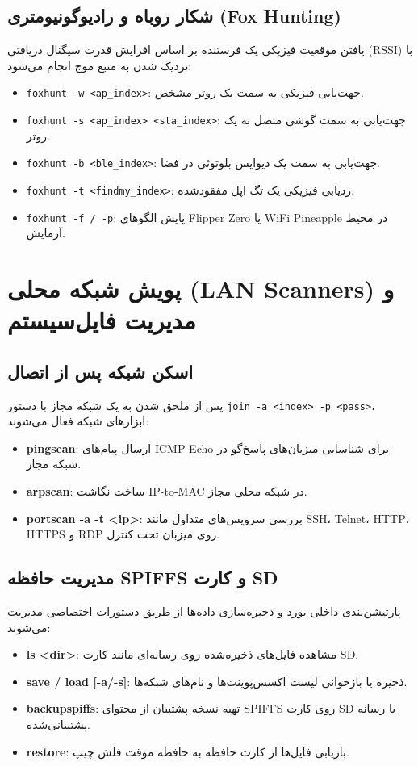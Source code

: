 \documentclass[11pt,a4paper]{article}
\newcommand{\lr}[1]{\foreignlanguage{english}{#1}}
\newcommand{\en}[1]{\lr{#1}}
\begin{document}
\subsection{شکار روباه و رادیوگونیومتری \en{(Fox Hunting)}}
یافتن موقعیت فیزیکی یک فرستنده بر اساس افزایش قدرت سیگنال دریافتی (\lr{RSSI}) با نزدیک شدن به منبع موج انجام می‌شود:
\begin{itemize}
    \item \lr{\texttt{foxhunt -w <ap\_index>}:} جهت‌یابی فیزیکی به سمت یک روتر مشخص.
    \item \lr{\texttt{foxhunt -s <ap\_index> <sta\_index>}:} جهت‌یابی به سمت گوشی متصل به یک روتر.
    \item \lr{\texttt{foxhunt -b <ble\_index>}:} جهت‌یابی به سمت یک دیوایس بلوتوثی در فضا.
    \item \lr{\texttt{foxhunt -t <findmy\_index>}:} ردیابی فیزیکی یک تگ اپل مفقودشده.
    \item \lr{\texttt{foxhunt -f / -p}:} پایش الگوهای \en{Flipper Zero} یا \en{WiFi Pineapple} در محیط آزمایش.
\end{itemize}

\section{پویش شبکه محلی \en{(LAN Scanners)} و مدیریت فایل‌سیستم}

\subsection{اسکن شبکه پس از اتصال}
پس از ملحق شدن به یک شبکه مجاز با دستور \lr{\texttt{join -a <index> -p <pass>}}، ابزارهای شبکه فعال می‌شوند:
\begin{itemize}
    \item \lr{\textbf{pingscan}:} ارسال پیام‌های \en{ICMP Echo} برای شناسایی میزبان‌های پاسخ‌گو در شبکه مجاز.
    \item \lr{\textbf{arpscan}:} ساخت نگاشت \en{IP-to-MAC} در شبکه محلی مجاز.
    \item \lr{\textbf{portscan -a -t <ip>}:} بررسی سرویس‌های متداول مانند \en{SSH}، \en{Telnet}، \en{HTTP}، \en{HTTPS} و \en{RDP} روی میزبان تحت کنترل.
\end{itemize}

\subsection{مدیریت حافظه \en{SPIFFS} و کارت \en{SD}}
پارتیشن‌بندی داخلی بورد و ذخیره‌سازی داده‌ها از طریق دستورات اختصاصی مدیریت می‌شوند:
\begin{itemize}
    \item \lr{\textbf{ls <dir>}:} مشاهده فایل‌های ذخیره‌شده روی رسانه‌ای مانند کارت \en{SD}.
    \item \lr{\textbf{save / load [-a/-s]}:} ذخیره یا بازخوانی لیست اکسس‌پوینت‌ها و نام‌های شبکه‌ها.
    \item \lr{\textbf{backupspiffs}:} تهیه نسخه پشتیبان از محتوای \en{SPIFFS} روی کارت \en{SD} یا رسانه پشتیبانی‌شده.
    \item \lr{\textbf{restore}:} بازیابی فایل‌ها از کارت حافظه به حافظه موقت فلش چیپ.
\end{itemize}
\end{document}
